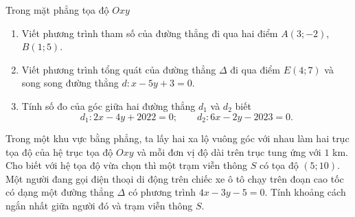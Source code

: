 \begin{bt}%
	Trong mặt phẳng tọa độ $Oxy$
	\begin{enumerate}
		\item Viết phương trình tham số của đường thẳng đi qua hai điểm $A(3;-2)$, $B(1;5)$.
		\item Viết phương trình tổng quát của đường thẳng $\Delta$ đi qua điểm $E(4;7)$ và song song đường thẳng $d\colon x-5y+3=0$.
		\item Tính số đo của góc giữa hai đường thẳng $d_1$ và $d_2$ biết
		$$d_1\colon 2x-4y+2022=0;\qquad d_2\colon 6x-2y-2023=0.$$
	\end{enumerate}
\end{bt}
\begin{bt}%
	Trong một khu vực bằng phẳng, ta lấy hai xa lộ vuông góc với nhau làm hai trục tọa độ của hệ trục tọa độ $Oxy$ và mỗi đơn vị độ dài trên trục tung ứng với $1$ km. Cho biết với hệ tọa độ vừa chọn thì một trạm viễn thông $S$ có tọa độ $(5;10)$. Một người đang gọi điện thoại di động trên chiếc xe ô tô chạy trên đoạn cao tốc có dạng một đường thẳng $\Delta$ có phương trình $4x-3y-5=0$. Tính khoảng cách ngắn nhất giữa người đó và trạm viễn thông $S$.
\end{bt}

